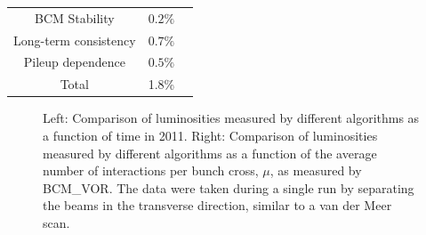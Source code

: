 \begin{table}[htbp]
\begin{tabular}{ccl}
		BCM Stability & $0.2\%$ & \\
		{Long-term consistency} & {$0.7\%$} & \\
		{Pileup dependence} & {$0.5\%$} & \\
		\hline
		\hline
		Total & 1.8\% & \\
		\hline
	\end{tabular}
\end{table}

\begin{figure}
	\centering
	\hfill
	\hfill
	\hfill
	\caption{Left:  Comparison of luminosities measured by different algorithms as a function of time in 2011. Right:  Comparison of luminosities measured by different algorithms as a function of the average number of interactions per bunch cross, $\mu$, as measured by BCM\_VOR. The data were taken during a single run by separating the beams in the transverse direction, similar to a van der Meer scan.}
	\label{fig:reco-luminosity-comparisons}
\end{figure}

